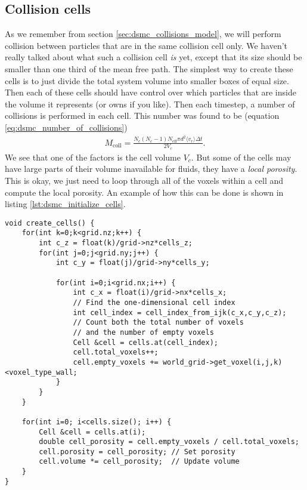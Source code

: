\subsection{Collision cells}
As we remember from section \ref{sec:dsmc_collisions_model}, we will perform collision between particles that are in the same collision cell only. We haven't really talked about what such a collision cell \textit{is} yet, except that its size should be smaller than one third of the mean free path. The simplest way to create these cells is to just divide the total system volume into smaller boxes of equal size. Then each of these cells should have control over which particles that are inside the volume it represents (or owns if you like). Then each timestep, a number of collisions is performed in each cell. This number was found to be (equation \eqref{eq:dsmc_number_of_collisions})
\begin{align}
	\nonumber
	M_\text{coll} = \frac{N_c(N_c-1)N_\text{eff}\pi d^2\langle v_r \rangle \Delta t}{2 V_c}.
\end{align}
We see that one of the factors is the cell volume $V_c$. But some of the cells may have large parts of their volume inavailable for fluids, they have a \textit{local porosity}. This is okay, we just need to loop through all of the voxels within a cell and compute the local porosity. An example of how this can be done is shown in listing \ref{lst:dsmc_initialize_cells}.
\begin{lstlisting}[caption=Example code showing how to find porosity and volume of the collision cells., label=lst:dsmc_initialize_cells]
void create_cells() {
    for(int k=0;k<grid.nz;k++) {
        int c_z = float(k)/grid->nz*cells_z;
        for(int j=0;j<grid.ny;j++) {
            int c_y = float(j)/grid->ny*cells_y;

            for(int i=0;i<grid.nx;i++) {
                int c_x = float(i)/grid->nx*cells_x;
                // Find the one-dimensional cell index 
                int cell_index = cell_index_from_ijk(c_x,c_y,c_z);
                // Count both the total number of voxels
                // and the number of empty voxels
                Cell &cell = cells.at(cell_index);
                cell.total_voxels++;
                cell.empty_voxels += world_grid->get_voxel(i,j,k)<voxel_type_wall;
            }
        }
    }

    for(int i=0; i<cells.size(); i++) {
    	Cell &cell = cells.at(i);
    	double cell_porosity = cell.empty_voxels / cell.total_voxels;
    	cell.porosity = cell_porosity; // Set porosity
    	cell.volume *= cell_porosity;  // Update volume
    }
}
\end{lstlisting}

